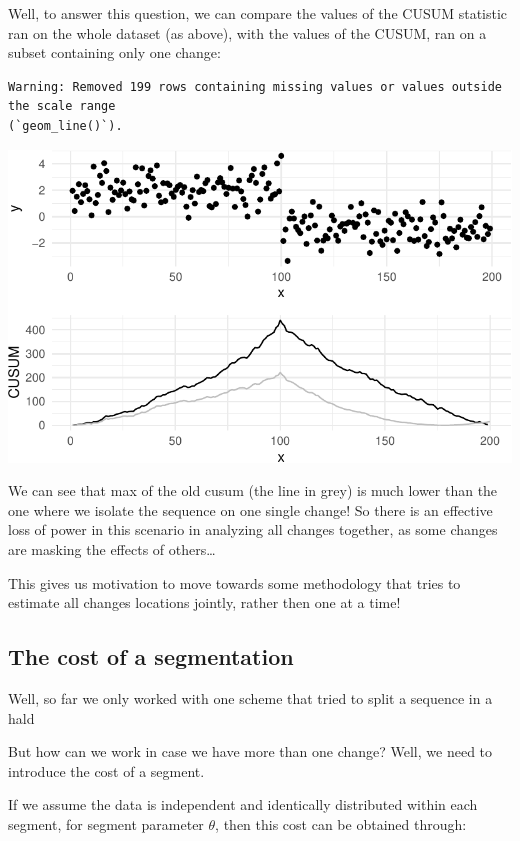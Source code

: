 \documentclass[
  letterpaper,
  DIV=11,
  numbers=noendperiod]{scrreprt}
\begin{document}
Well, to answer this question, we can compare the values of the CUSUM
statistic ran on the whole dataset (as above), with the values of the
CUSUM, ran on a subset containing only one change:

\begin{verbatim}
Warning: Removed 199 rows containing missing values or values outside the scale range
(`geom_line()`).
\end{verbatim}

\includegraphics{3_multiple_changes_files/figure-pdf/unnamed-chunk-4-1.pdf}

We can see that max of the old cusum (the line in grey) is much lower
than the one where we isolate the sequence on one single change! So
there is an effective loss of power in this scenario in analyzing all
changes together, as some changes are masking the effects of
others\ldots{}

This gives us motivation to move towards some methodology that tries to
estimate all changes locations jointly, rather then one at a time!

\subsection{The cost of a
segmentation}\label{the-cost-of-a-segmentation}

Well, so far we only worked with one scheme that tried to split a
sequence in a hald

But how can we work in case we have more than one change? Well, we need
to introduce the cost of a segment.

If we assume the data is independent and identically distributed within
each segment, for segment parameter \(\theta\), then this cost can be
obtained through:
\end{document}
